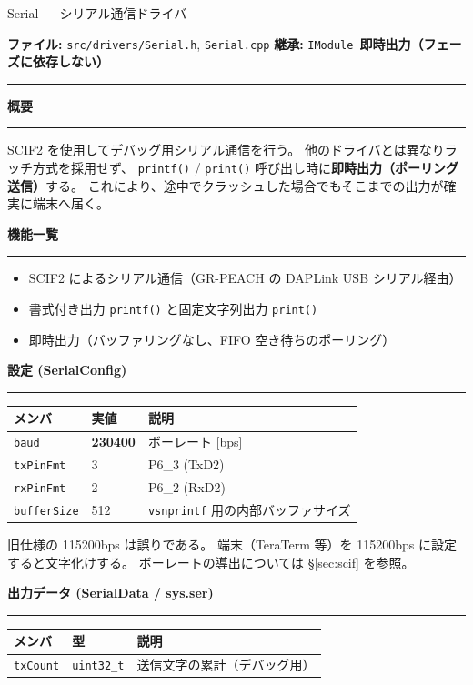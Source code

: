 \documentclass[a4paper,11pt,dvipdfmx]{jsarticle}
\makeatletter
\newcommand{\apisection}[1]{%
  \par\addvspace{4mm}%
  {\normalsize\bfseries\color{headerblue} #1}%
  \par\vspace{-1mm}%
  {\color{accentblue!40}\rule{\linewidth}{0.5pt}}%
  \par\nobreak\vspace{2mm}%
  \@afterheading
}
\newcommand{\phasebadge}[1]{%
  \colorbox{accentblue!10}{\small\bfseries\color{accentblue!80!black}\,#1\,}%
}
\makeatother
\begin{document}
\begin{apibox}{Serial --- シリアル通信ドライバ}

\textbf{ファイル:} \texttt{src/drivers/Serial.h}, \texttt{Serial.cpp} \hfill
\textbf{継承:} \texttt{IModule} \hfill
\phasebadge{即時出力（フェーズに依存しない）}

\vspace{2mm}\hrule\vspace{2mm}

\apisection{概要}

SCIF2 を使用してデバッグ用シリアル通信を行う。
他のドライバとは異なりラッチ方式を採用せず、
\texttt{printf()} / \texttt{print()} 呼び出し時に\textbf{即時出力（ポーリング送信）}する。
これにより、途中でクラッシュした場合でもそこまでの出力が確実に端末へ届く。

\apisection{機能一覧}

\begin{itemize}[nosep]
  \item SCIF2 によるシリアル通信（GR-PEACH の DAPLink USB シリアル経由）
  \item 書式付き出力 \texttt{printf()} と固定文字列出力 \texttt{print()}
  \item 即時出力（バッファリングなし、FIFO 空き待ちのポーリング）
\end{itemize}

\apisection{設定 (SerialConfig)}

\begin{tabularx}{\textwidth}{l l X}
\toprule
\textbf{メンバ} & \textbf{実値} & \textbf{説明} \\
\midrule
\texttt{baud}       & \textbf{230400} & ボーレート [bps] \\
\texttt{txPinFmt}   & 3   & P6\_3 (TxD2) \\
\texttt{rxPinFmt}   & 2   & P6\_2 (RxD2) \\
\texttt{bufferSize} & 512 & \texttt{vsnprintf} 用の内部バッファサイズ \\
\bottomrule
\end{tabularx}

\begin{cautionbox}
旧仕様の 115200bps は誤りである。
端末（TeraTerm 等）を 115200bps に設定すると文字化けする。
ボーレートの導出については \hyperref[sec:scif]{§\ref*{sec:scif}} を参照。
\end{cautionbox}

\apisection{出力データ (SerialData / sys.ser)}

\begin{tabularx}{\textwidth}{l l X}
\toprule
\textbf{メンバ} & \textbf{型} & \textbf{説明} \\
\midrule
\texttt{txCount} & \texttt{uint32\_t} & 送信文字の累計（デバッグ用） \\
\bottomrule
\end{tabularx}


\end{apibox}
\end{document}
